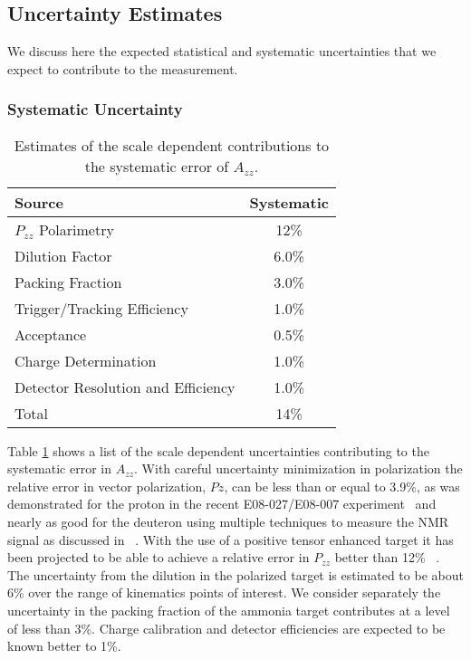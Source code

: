 \subsection{Uncertainty Estimates}
\label{uncertainties}
We discuss here the expected statistical and systematic uncertainties that we expect to contribute to the measurement.



\iffalse
\subsubsection{Systematic Uncertainty}%
\begin{table}
\begin{center}
\begin{tabular}{l|c}\hline\hline
Source								& Systematic \\
\hline
$P_{zz}$ Polarimetry					& 12\%   \\
Dilution Factor						& 6.0\%   \\
Packing Fraction						& 3.0\%   \\
Trigger/Tracking Efficiency			& 1.0\% \\
Acceptance							& 0.5\% \\
Charge Determination					& 1.0\%  \\
Detector Resolution and Efficiency	& 1.0\% \\
\hline
Total								& 14\%   \\
\hline
\end{tabular}
\caption{\label{error1}Estimates of the scale dependent contributions to the systematic error of $A_{zz}$.}
\end{center}
\end{table}

Table \ref{error1} shows a list of the scale dependent uncertainties contributing to the systematic error in $A_{zz}$.
With careful uncertainty minimization in polarization the relative error in vector polarization, $Pz$, can be less than or equal to 3.9\%, as was demonstrated for the proton in the recent E08-027/E08-007 experiment~\cite{NIMDUST} and nearly as good for the deuteron using multiple techniques to measure the NMR signal as discussed in ~\cite{PTSTDUST}.  With the use of a positive tensor enhanced target it has been projected to be able to achieve a relative error in $P_{zz}$ better than 12\% ~\cite{PTSTDUST}.  The uncertainty from the dilution in the polarized target is estimated to be
about 6\% over the range of kinematics points of interest.  We consider separately the uncertainty in the packing fraction of the ammonia target contributes at a level of less than 3\%. Charge calibration and detector efficiencies are expected to be known better to 1\%. 


